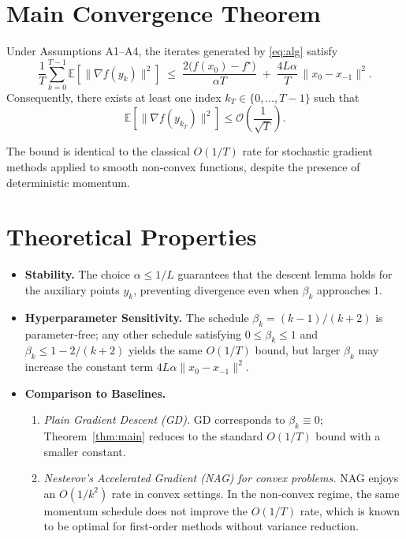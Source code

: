 \documentclass{article}
\begin{document}
\section*{Main Convergence Theorem}
\begin{theorem}\label{thm:main}
Under Assumptions A1–A4, the iterates generated by \eqref{eq:alg} satisfy
\[
\frac{1}{T}\sum_{k=0}^{T-1}\mathbb{E}\!\left[\|\nabla f(y_k)\|^2\right]
\;\le\;
\frac{2\bigl(f(x_0)-f^\star\bigr)}{\alpha T}
\;+\;
\frac{4L\alpha}{T}\,\bigl\|x_0-x_{-1}\bigr\|^2 .
\tag{2}
\]
Consequently, there exists at least one index $k_T\in\{0,\dots,T-1\}$ such that
\[
\mathbb{E}\!\left[\|\nabla f(y_{k_T})\|^2\right]\le
\mathcal{O}\!\left(\frac{1}{\sqrt{T}}\right).
\]
\end{theorem}
The bound is identical to the classical $O(1/T)$ rate for stochastic gradient methods applied to smooth non‑convex functions, despite the presence of deterministic momentum.

\section*{Theoretical Properties}
\begin{itemize}
\item \textbf{Stability.} The choice $\alpha\le1/L$ guarantees that the descent lemma holds for the auxiliary points $y_k$, preventing divergence even when $\beta_k$ approaches $1$.
\item \textbf{Hyperparameter Sensitivity.} The schedule $\beta_k=(k-1)/(k+2)$ is parameter‑free; any other schedule satisfying $0\le\beta_k\le 1$ and $\beta_k\le 1-2/(k+2)$ yields the same $O(1/T)$ bound, but larger $\beta_k$ may increase the constant term $4L\alpha\|x_0-x_{-1}\|^2$.
\item \textbf{Comparison to Baselines.}
    \begin{enumerate}
    \item \emph{Plain Gradient Descent (GD).} GD corresponds to $\beta_k\equiv0$; Theorem~\ref{thm:main} reduces to the standard $O(1/T)$ bound with a smaller constant.
    \item \emph{Nesterov’s Accelerated Gradient (NAG) for convex problems.} NAG enjoys an $O(1/k^2)$ rate in convex settings. In the non‑convex regime, the same momentum schedule does not improve the $O(1/T)$ rate, which is known to be optimal for first‑order methods without variance reduction.
    \end{enumerate}
\end{itemize}
\end{document}
